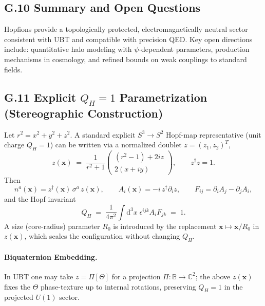 \subsection*{G.10 Summary and Open Questions}
Hopfions provide a topologically protected, electromagnetically neutral sector consistent with UBT and compatible with precision QED. 
Key open directions include: quantitative halo modeling with $\psi$-dependent parameters, production mechanisms in cosmology, and refined bounds on weak couplings to standard fields.

\subsection*{G.11 Explicit $Q_H=1$ Parametrization (Stereographic Construction)}
Let $r^2=x^2+y^2+z^2$. A standard explicit $S^3\!\to\!S^2$ Hopf-map representative (unit charge $Q_H=1$) can be written via a normalized doublet $z=(z_1,z_2)^T$,
\begin{equation}
z(\mathbf{x}) \;=\; \frac{1}{r^2+1}\begin{pmatrix}
(r^2-1) + 2 i z \\[4pt]
2(x+i y)
\end{pmatrix},\qquad z^\dagger z = 1.
\end{equation}
Then
\begin{equation}
n^a(\mathbf{x}) = z^\dagger(\mathbf{x})\,\sigma^a\, z(\mathbf{x}),\qquad
A_i(\mathbf{x})=-i\, z^\dagger \partial_i z,\qquad F_{ij}=\partial_i A_j-\partial_j A_i,
\end{equation}
and the Hopf invariant
\begin{equation}
Q_H \;=\; \frac{1}{4\pi^2}\int\!\mathrm{d}^3x\;\epsilon^{ijk} A_i F_{jk} \;=\; 1.
\end{equation}
A size (core-radius) parameter $R_0$ is introduced by the replacement $\mathbf{x}\mapsto \mathbf{x}/R_0$ in $z(\mathbf{x})$, which scales the configuration without changing $Q_H$.

\paragraph{Biquaternion Embedding.} In UBT one may take $z=\Pi[\Theta]$ for a projection $\Pi:\mathbb{B}\!\to\!\mathbb{C}^2$; the above $z(\mathbf{x})$ fixes the $\Theta$ phase-texture up to internal rotations, preserving $Q_H=1$ in the projected $U(1)$ sector.

